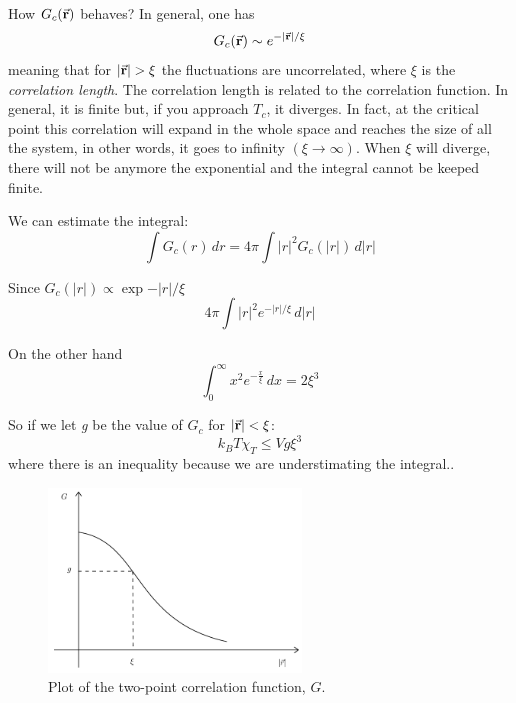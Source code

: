 \documentclass[../../Main/Main.tex]{subfiles}
\begin{document}
How \( G_c (\va{r}) \) behaves? In general, one has
\begin{equation}
  G_c (\va{r}) \sim e^{- \abs{\va{r}}/\xi  }
\end{equation}
meaning that for \( \abs{\va{r}} > \xi   \) the fluctuations are uncorrelated, where \( \xi  \) is the \emph{correlation length}.
The correlation length is related to the correlation function. In general, it is finite but, if you approach \( T_c \), it diverges. In fact, at the critical point this correlation will expand in the whole space and reaches the size of all the system, in other words, it goes to infinity \( (\xi \rightarrow \infty ) \). When \( \xi  \)  will diverge, there will not be anymore the exponential and the integral cannot be keeped finite.

We can estimate the integral:
\begin{equation}
  \int G_{c}(r) \, dr  = 4 \pi \int \lvert r \rvert ^2 G_{c}( \lvert r \rvert  )\, d \lvert r \rvert 
\end{equation}

Since $G_{c}( \lvert r  \rvert ) \propto \exp{- \lvert r \rvert / \xi}$
\begin{equation}
  4\pi \int \lvert r \rvert^2 e^{- \lvert r \rvert/ \xi } \, d \lvert r \rvert
\end{equation}


On the other hand 
\begin{equation}
  \int_{0}^\infty x^2 e^{-\frac{x}{\xi}} \, dx = 2\xi^3
\end{equation}


So if we let \emph{g} be the value of \( G_c \) for \( \abs{\va{r}} < \xi \):
\begin{equation*}
  k_B T \chi _T \le V g \xi ^3
\end{equation*}
where there is an inequality because we are understimating the integral..

\begin{figure}[h!]
\centering
\includegraphics[width=0.6\textwidth]{./img/1.pdf}
\caption{\label{fig:5_1} Plot of the  two-point correlation function, \( G \).}
\end{figure}
\end{document}
